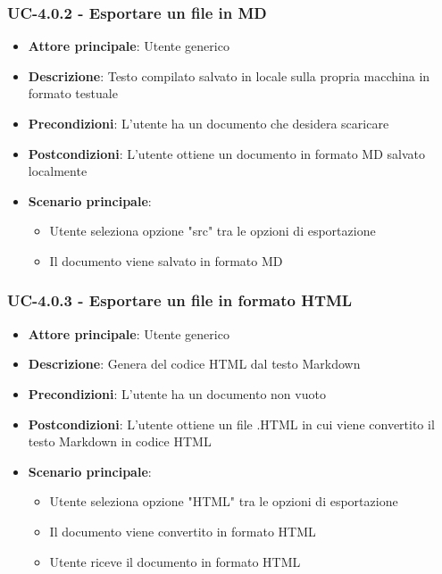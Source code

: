 \documentclass[11pt,a4paper]{article}
\begin{document}
\subsubsection{UC-4.0.2 - Esportare un file in MD}
\begin{itemize}
    \item \textbf{Attore principale}: Utente generico
    \item \textbf{Descrizione}: Testo compilato salvato in locale sulla propria macchina in formato testuale
    \item \textbf{Precondizioni}: L'utente ha un documento che desidera scaricare
    \item \textbf{Postcondizioni}: L'utente ottiene un documento in formato MD salvato localmente
    \item \textbf{Scenario principale}:
        \begin{itemize}
            \item Utente seleziona opzione "src" tra le opzioni di esportazione
            \item Il documento viene salvato in formato MD
        \end{itemize}
\end{itemize}

\subsubsection{UC-4.0.3 - Esportare un file in formato HTML}
\begin{itemize}
    \item \textbf{Attore principale}: Utente generico
    \item \textbf{Descrizione}: Genera del codice HTML dal testo Markdown
    \item \textbf{Precondizioni}: L'utente ha un documento non vuoto
    \item \textbf{Postcondizioni}: L'utente ottiene un file .HTML in cui viene convertito il testo Markdown in codice HTML
    \item \textbf{Scenario principale}:
        \begin{itemize}
            \item Utente seleziona opzione "HTML" tra le opzioni di esportazione
            \item Il documento viene convertito in formato HTML
            \item Utente riceve il documento in formato HTML
        \end{itemize}
\end{itemize}
\end{document}
